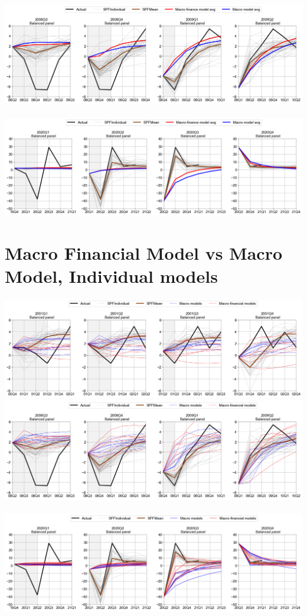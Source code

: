 \documentclass{article}
\begin{document}
\begin{landscape}
\pagebreak
\includegraphics[scale=0.7]{MacroFin_vs_Macro_avg_20082009}\\
\bigskip \\
\includegraphics[scale=0.7]{MacroFin_vs_Macro_avg_20202021}

\pagebreak
\section{\Large Macro Financial Model vs Macro Model, Individual models}

\includegraphics[scale=0.7]{MacroFin_vs_Macro_indi20012002}\\

\pagebreak
\includegraphics[scale=0.7]{MacroFin_vs_Macro_indi20082009}\\
\bigskip \\
\includegraphics[scale=0.7]{MacroFin_vs_Macro_indi20202021}


\end{landscape}
\end{document}
